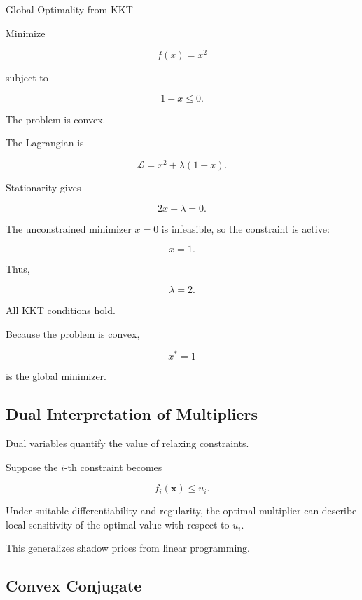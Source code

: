\begin{workedexamplebox}{Global Optimality from KKT}

Minimize

\[
f(x)=x^2
\]

subject to

\[
1-x\leq0.
\]

The problem is convex.

The Lagrangian is

\[
\mathcal{L}
=
x^2+\lambda(1-x).
\]

Stationarity gives

\[
2x-\lambda=0.
\]

The unconstrained minimizer \(x=0\) is infeasible, so the constraint is
active:

\[
x=1.
\]

Thus,

\[
\lambda=2.
\]

All KKT conditions hold.

Because the problem is convex,

\begin{answerbox}
\[
\boxed{
x^*=1
}
\]

is the global minimizer.
\end{answerbox}

\end{workedexamplebox}

\subsection{Dual Interpretation of Multipliers}
\label{subsec:convex-dual-multiplier-interpretation}

Dual variables quantify the value of relaxing constraints.

Suppose the \(i\)-th constraint becomes

\[
f_i(\mathbf{x})\leq u_i.
\]

Under suitable differentiability and regularity, the optimal multiplier
can describe local sensitivity of the optimal value with respect to
\(u_i\).

This generalizes shadow prices from linear programming.

\subsection{Convex Conjugate}
\label{subsec:convex-conjugate}

